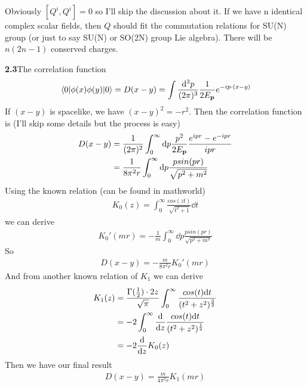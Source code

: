 \documentclass{article}
\newcommand{\intphead}[1]{\int\frac{\dd^3#1}{(2\pi)^3}}
\begin{document}
Obviously $[Q^i,Q^i]=0$ so I'll skip the discussion about it.
If we have n identical complex scalar fields, then $Q$ should fit the commutation relations for SU(N) group (or just to say SU(N) or SO(2N) group Lie algebra). There will be $n(2n-1)$ conserved charges.

{\bf2.3}\quad The correlation function
\begin{align}
  \mel{0}{\phi(x)\phi(y)}{0}=D(x-y)=\intphead{p}\frac{1}{2E_{\vb{p}}}e^{-ip\cdot(x-y)}
\end{align}
If $(x-y)$ is spacelike, we have $(x-y)^2=-r^2$. Then the correlation function is (I'll skip some details but the process is easy)
\begin{align}
  D(x-y)&=\frac{1}{(2\pi)^2}\int^{\infty}_{0}\dd p\frac{p^2}{2E_{\vb{p}}}\frac{e^{ipr}-e^{-ipr}}{ipr}\\
  &=\frac{1}{8\pi^2r}\int^{\infty}_0\dd p\frac{psin(pr)}{\sqrt{p^2+m^2}}
\end{align}
Using the known relation (can be found in mathworld)
\begin{align}
  K_0(z)=\int_0^{\infty}\frac{cos(zt)}{\sqrt{t^2+1}}\dd t
\end{align}
we can derive
\begin{align*}
  K_0'(mr)=-\frac{1}{m}\int^{\infty}_{0}\dd p\frac{psin(pr)}{\sqrt{p^2+m^2}}
\end{align*}
So
\begin{align}
  D(x-y)=-\frac{m}{8\pi^2r}K_0'(mr)
\end{align}
And from another known relation of $K_1$ we can derive
\begin{align*}
  K_1(z)&=\frac{\Gamma(\frac{1}{2})\cdot2z}{\sqrt{\pi}}\int^{\infty}_0\frac{cos(t)\dd t}{(t^2+z^2)^{\frac{3}{2}}}\\
  &=-2\int^{\infty}_0\dv{z}\frac{cos(t)\dd t}{(t^2+z^2)^{\frac{1}{2}}}\\
  &=-2\dv{z}K_0(z)
\end{align*}
Then we have our final result
\begin{align}
  D(x-y)=\frac{m}{4\pi^2r}K_1(mr)
\end{align}
\end{document}
